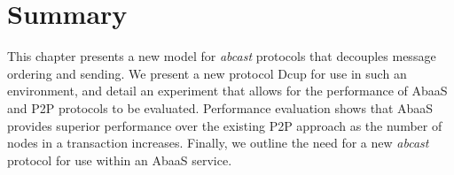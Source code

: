 \section{Summary}
This chapter presents a new model for \emph{abcast} protocols that decouples message ordering and sending.  We present a new protocol \textsf{Dcup} for use in such an environment, and detail an experiment that allows for the performance of \textsf{AbaaS} and P2P protocols to be evaluated.  Performance evaluation shows that \textsf{AbaaS} provides superior performance over the existing P2P approach as the number of nodes in a transaction increases.  Finally, we outline the need for a new \emph{abcast} protocol for use within an \textsf{AbaaS} service. 